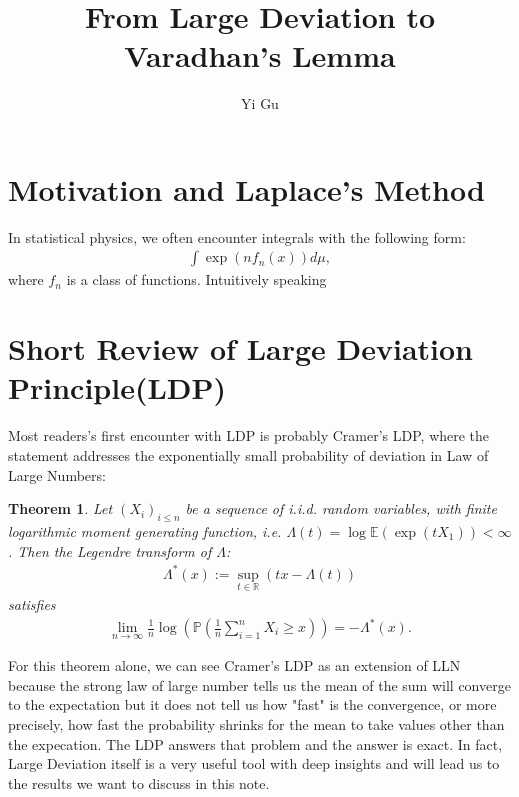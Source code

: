 \documentclass[10pt]{article}
\author{Yi Gu}
\newcommand{\e}{\mathbb{E}}
\newcommand{\p}{\mathbb{P}}
\newtheorem{theorem}{\bf Theorem}
\newenvironment{Proof of lemma}{\noindent{\bf Proof of Lemma}}{\hfill$\Box$\newline}
\newenvironment{Proof of claim}{\noindent{\bf Proof of claim}}{\hfill$\Box$\newline}
\newenvironment{Proof of theorem}{\noindent{\bf Proof of Theorem}}{\hfill\scriptsize{$\Box$}\newline}
\newenvironment{Proof of theorems}{\noindent{\bf Proof of Theorems}}{\hfill$\Box$\newline}
\newenvironment{Proof of proposition}{\noindent{\bf Proof of Proposition}}{\hfill$\Box$\newline}
\newenvironment{Proof of propositions}{\noindent{\bf Proof of Propositions}}{\hfill$\Box$\newline}
\newenvironment{Proof of exercise}{\noindent{\it Proof of Exercise:}}{\hfill$\Box$}
\numberwithin{equation}{section}
\begin{document}
\title{From Large Deviation to Varadhan's Lemma}
\maketitle
\section{Motivation and Laplace's Method}
In statistical physics, we often encounter integrals with the following form:
\begin{align}
    \int \exp(nf_n(x))d\mu,
\end{align}
where $f_n$ is a class of functions. Intuitively speaking
\section{Short Review of Large Deviation Principle(LDP)}
Most readers's first encounter with LDP is probably Cramer's LDP, where the statement addresses the exponentially small probability of deviation in Law of Large Numbers:
\begin{theorem}
    Let $(X_i)_{i \leq n}$ be a sequence of i.i.d. random variables, with finite logarithmic moment generating function, i.e. $\Lambda(t) = \log \e(\exp (tX_1)) < \infty$. Then the Legendre transform of $\Lambda$:
    \begin{align} \label{cramer_rate}
        \Lambda^{\ast} (x):= \sup_{t \in \mathbb{R}}(tx - \Lambda(t))
    \end{align}
    satisfies
    \begin{align} \label{cramer_ldp}
        \lim_{n \to \infty} \frac{1}{n} \log \left(\p \left(\frac{1}{n}\sum_{i=1}^n X_i \geq x\right)\right) = -\Lambda^{\ast}(x).
    \end{align}
\end{theorem}
For this theorem alone, we can see Cramer's LDP as an extension of LLN because the strong law of large number tells us the mean of the sum will converge to the expectation but it does not tell us how "fast" is the convergence, or more precisely, how fast the probability shrinks for the mean to take values other than the expecation. The LDP answers that problem and the answer is exact. In fact, Large Deviation itself is a very useful tool with deep insights and will lead us to the results we want to discuss in this note.
\end{document}
